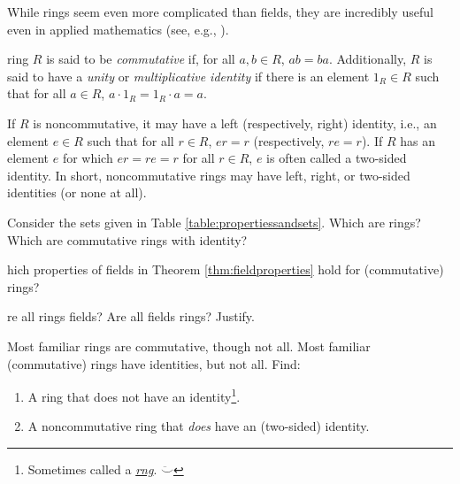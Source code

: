 \documentclass[english,course]{lecture}
\theoremstyle{plain}
\newenvironment{question}[1]
  {\renewcommand\theinnerquestion{#1}\innerquestion}
  {\endinnerquestion}
\newenvironment{definition}[1]
  {\renewcommand\theinnerdefinition{#1}\innerdefinition}
  {\endinnerdefinition}
\def\presnotes{}
\begin{document}
\presnotes


While rings seem even more complicated than fields, they are incredibly useful even in applied mathematics (see, e.g., \cite{Curto2013}).

\begin{definition}
	A ring $R$ is said to be \emph{commutative} if, for all $a,b\in R$, $ab = ba$.
	Additionally, $R$ is said to have a \emph{unity} or \emph{multiplicative identity} if there is an element $1_R\in R$ such that for all $a\in R$, $a \cdot 1_R = 1_R \cdot a= a$.
\end{definition}

If $R$ is noncommutative, it may have a left (respectively, right) identity, i.e., an element $e\in R$ such that for all $r\in R$, $er = r$ (respectively, $re = r$).
If $R$ has an element $e$ for which $er = re = r$ for all $r\in R$, $e$ is often called a two-sided identity.
In short, noncommutative rings may have left, right, or two-sided identities (or none at all).

\begin{exer}
	Consider the sets given in Table \ref{table:propertiessandsets}. Which are rings? Which are commutative rings with identity? 
\end{exer}

\presnotes


\begin{question}
	Which properties of fields in Theorem \ref{thm:fieldproperties} hold for (commutative) rings?
\end{question}

\presnotes

\begin{question}
	Are all rings fields?
	Are all fields rings?
	Justify.
\end{question}

\presnotes

\begin{exer}
	Most familiar rings are commutative, though not all.
	Most familiar (commutative) rings have identities, but not all.
	Find:
	\begin{enumerate}
		\item A ring that does not have an identity\footnote{Sometimes called a \href{https://en.wikipedia.org/wiki/Rng_(algebra)}{\emph{rng}}. $\ddot\smile$}. 
		\item A noncommutative ring that \emph{does} have an (two-sided) identity.
	\end{enumerate}
\end{exer}
\end{document}
